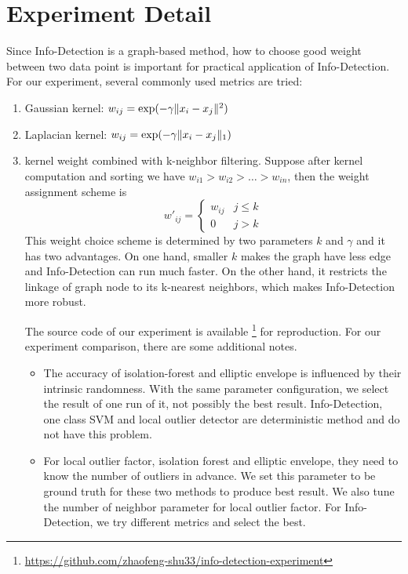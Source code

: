 \documentclass[runningheads]{llncs}
\begin{document}
\section{Experiment Detail}
Since Info-Detection is a graph-based method, how to choose good weight between two data point is important for practical application of Info-Detection. For our experiment, several commonly used metrics are tried: 
\begin{enumerate}
\item Gaussian kernel: $w_{ij} = \exp(-\gamma \lVert x_i - x_j\rVert^2)$
\item Laplacian kernel: $w_{ij} = \exp(-\gamma \lVert x_i - x_j\rVert_1)$
\item kernel weight combined with k-neighbor filtering. Suppose after kernel computation and sorting we have $w_{i1} > w_{i2} > \dots > w_{in}$, then the weight assignment scheme is
$$
w'_{ij}  = 
\begin{cases}
 w_{ij} & j \leq k \\
 0 & j > k
\end{cases}
$$
This weight choice scheme is determined by two parameters $k$ and $\gamma$ and it has two advantages. On one hand, smaller $k$ makes the graph have less edge and Info-Detection can run much faster. On the other hand, it restricts the linkage of graph node to its k-nearest neighbors, which makes Info-Detection more robust.

The source code of our experiment is available \footnote{\scriptsize\url{https://github.com/zhaofeng-shu33/info-detection-experiment}} for reproduction.
For our experiment comparison, there are some additional notes.
\begin{itemize}
\item The accuracy of isolation-forest and elliptic envelope is influenced by their intrinsic randomness. With the same parameter configuration, we select the result of one run of it, not possibly the best result. Info-Detection, one class SVM and local outlier detector are deterministic method and do not have this problem.
\item For local outlier factor, isolation forest and elliptic envelope, they need to know the number of outliers in advance. We set this parameter to be ground truth for these two methods to produce best result. We also tune the number of neighbor parameter for local outlier factor. For Info-Detection, we try different metrics and select the best.
\end{itemize}

\end{enumerate} 
\end{document}
